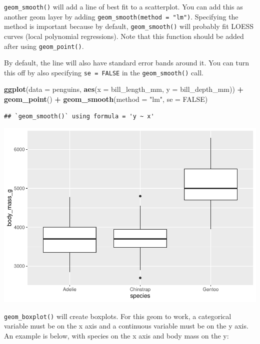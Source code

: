 \documentclass[
]{book}
\newenvironment{Shaded}{\begin{snugshade}}{\end{snugshade}}
\newcommand{\AttributeTok}[1]{\textcolor[rgb]{0.13,0.29,0.53}{#1}}
\newcommand{\ConstantTok}[1]{\textcolor[rgb]{0.56,0.35,0.01}{#1}}
\newcommand{\FunctionTok}[1]{\textcolor[rgb]{0.13,0.29,0.53}{\textbf{#1}}}
\newcommand{\NormalTok}[1]{#1}
\newcommand{\SpecialCharTok}[1]{\textcolor[rgb]{0.81,0.36,0.00}{\textbf{#1}}}
\newcommand{\StringTok}[1]{\textcolor[rgb]{0.31,0.60,0.02}{#1}}
\begin{document}
\texttt{geom\_smooth()} will add a line of best fit to a scatterplot. You can add this as another geom layer by adding \texttt{geom\_smooth(method\ =\ "lm")}. Specifying the method is important because by default, \texttt{geom\_smooth()} will probably fit LOESS curves (local polynomial regressions). Note that this function should be added after using \texttt{geom\_point()}.

By default, the line will also have standard error bands around it. You can turn this off by also specifying \texttt{se\ =\ FALSE} in the \texttt{geom\_smooth()} call.

\begin{Shaded}
\begin{Highlighting}[]
\FunctionTok{ggplot}\NormalTok{(}\AttributeTok{data =}\NormalTok{ penguins, }\FunctionTok{aes}\NormalTok{(}\AttributeTok{x =}\NormalTok{ bill\_length\_mm, }\AttributeTok{y =}\NormalTok{ bill\_depth\_mm)) }\SpecialCharTok{+} 
  \FunctionTok{geom\_point}\NormalTok{() }\SpecialCharTok{+}
  \FunctionTok{geom\_smooth}\NormalTok{(}\AttributeTok{method =} \StringTok{"lm"}\NormalTok{, }\AttributeTok{se =} \ConstantTok{FALSE}\NormalTok{)}
\end{Highlighting}
\end{Shaded}

\begin{verbatim}
## `geom_smooth()` using formula = 'y ~ x'
\end{verbatim}

\includegraphics{_main_files/figure-latex/unnamed-chunk-54-1.pdf}

\texttt{geom\_boxplot()} will create boxplots. For this geom to work, a categorical variable must be on the x axis and a continuous variable must be on the y axis. An example is below, with species on the x axis and body mass on the y:
\end{document}
